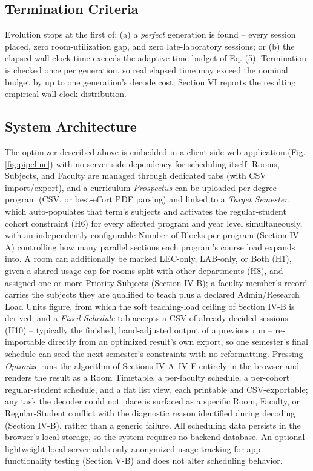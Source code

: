 \documentclass[conference]{IEEEtran}
\begin{document}
\subsection{Termination Criteria}
Evolution stops at the first of: (a) a \emph{perfect} generation is found -- every session placed, zero room-utilization gap, and zero late-laboratory sessions; or (b) the elapsed wall-clock time exceeds the adaptive time budget of Eq. (5). Termination is checked once per generation, so real elapsed time may exceed the nominal budget by up to one generation's decode cost; Section VI reports the resulting empirical wall-clock distribution.

\subsection{System Architecture}
The optimizer described above is embedded in a client-side web application (Fig. \ref{fig:pipeline}) with no server-side dependency for scheduling itself: Rooms, Subjects, and Faculty are managed through dedicated tabs (with CSV import/export), and a curriculum \emph{Prospectus} can be uploaded per degree program (CSV, or best-effort PDF parsing) and linked to a \emph{Target Semester}, which auto-populates that term's subjects and activates the regular-student cohort constraint (H6) for every affected program and year level simultaneously, with an independently configurable Number of Blocks per program (Section IV-A) controlling how many parallel sections each program's course load expands into. A room can additionally be marked LEC-only, LAB-only, or Both (H1), given a shared-usage cap for rooms split with other departments (H8), and assigned one or more Priority Subjects (Section IV-B); a faculty member's record carries the subjects they are qualified to teach plus a declared Admin/Research Load Units figure, from which the soft teaching-load ceiling of Section IV-B is derived; and a \emph{Fixed Schedule} tab accepts a CSV of already-decided sessions (H10) -- typically the finished, hand-adjusted output of a previous run -- re-importable directly from an optimized result's own export, so one semester's final schedule can seed the next semester's constraints with no reformatting. Pressing \emph{Optimize} runs the algorithm of Sections IV-A--IV-F entirely in the browser and renders the result as a Room Timetable, a per-faculty schedule, a per-cohort regular-student schedule, and a flat list view, each printable and CSV-exportable; any task the decoder could not place is surfaced as a specific Room, Faculty, or Regular-Student conflict with the diagnostic reason identified during decoding (Section IV-B), rather than a generic failure. All scheduling data persists in the browser's local storage, so the system requires no backend database. An optional lightweight local server adds only anonymized usage tracking for app-functionality testing (Section V-B) and does not alter scheduling behavior.
\end{document}

